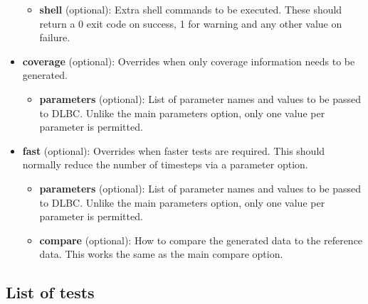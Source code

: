 \documentclass{article}
\begin{document}
\begin{itemize}
\begin{itemize}
\item \textbf{shell} (optional): Extra shell commands to be executed. These should return a 0 exit code on success, 1 for warning and any other value on failure.
\end{itemize}
\item \textbf{coverage} (optional): Overrides when only coverage information needs to be generated.
\begin{itemize}
\item \textbf{parameters} (optional): List of parameter names and values to be passed to DLBC. Unlike the main parameters option, only one value per parameter is permitted.
\end{itemize}
\item \textbf{fast} (optional): Overrides when faster tests are required. This should normally reduce the number of timesteps via a parameter option.
\begin{itemize}
\item \textbf{parameters} (optional): List of parameter names and values to be passed to DLBC. Unlike the main parameters option, only one value per parameter is permitted.
\item \textbf{compare} (optional): How to compare the generated data to the reference data. This works the same as the main compare option.
\end{itemize}
\end{itemize}

\subsection{List of tests}


\end{document}
